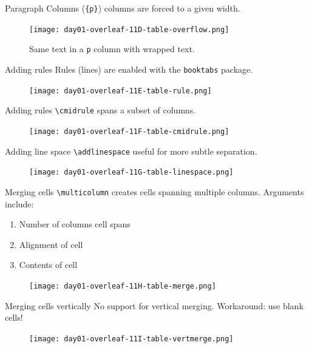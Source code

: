 \documentclass{beamer}
\begin{document}
{  \begin{frame}{Paragraph Columns}
    (\texttt{\{p\}}) columns are forced to a given width.
    \begin{figure}
      \texttt{[image: day01-overleaf-11D-table-overflow.png]}
      \caption{Same text in a \texttt{p} column with wrapped text.}
      \label{fig:day01-overleaf-11D}
    \end{figure}
  \end{frame}

  \begin{frame}{Adding rules}
    Rules (lines) are enabled with the \texttt{booktabs} package.
    \begin{figure}
      \texttt{[image: day01-overleaf-11E-table-rule.png]}
    \end{figure}
  \end{frame}

  \begin{frame}{Adding rules}
    \texttt{\textbackslash cmidrule} spans a subset of columns.
    \begin{figure}
      \texttt{[image: day01-overleaf-11F-table-cmidrule.png]}
    \end{figure}
  \end{frame}

  \begin{frame}{Adding line space}
    \texttt{\textbackslash addlinespace} useful for more subtle separation.
    \begin{figure}
      \texttt{[image: day01-overleaf-11G-table-linespace.png]}
    \end{figure}
  \end{frame}

  \begin{frame}{Merging cells}
    \texttt{\textbackslash multicolumn} creates cells spanning multiple columns. Arguments include:
    \begin{enumerate}
      \item Number of columns cell spans
      \item Alignment of cell
      \item Contents of cell
    \end{enumerate}
    \begin{figure}
      \texttt{[image: day01-overleaf-11H-table-merge.png]}
    \end{figure}
  \end{frame}

  \begin{frame}{Merging cells vertically}
    No support for vertical merging. Workaround: use blank cells!
    \begin{figure}
      \texttt{[image: day01-overleaf-11I-table-vertmerge.png]}
    \end{figure}
  \end{frame}

}
\end{document}
